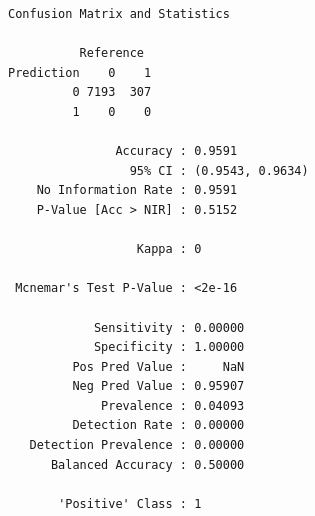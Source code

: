 \documentclass[
  letterpaper,
  DIV=11,
  numbers=noendperiod]{scrreprt}
\newenvironment{Shaded}{\begin{snugshade}}{\end{snugshade}}
\newcommand{\AttributeTok}[1]{\textcolor[rgb]{0.40,0.45,0.13}{#1}}
\newcommand{\FunctionTok}[1]{\textcolor[rgb]{0.28,0.35,0.67}{#1}}
\newcommand{\NormalTok}[1]{\textcolor[rgb]{0.00,0.23,0.31}{#1}}
\newcommand{\SpecialCharTok}[1]{\textcolor[rgb]{0.37,0.37,0.37}{#1}}
\newcommand{\StringTok}[1]{\textcolor[rgb]{0.13,0.47,0.30}{#1}}
\begin{document}
\begin{verbatim}
Confusion Matrix and Statistics

          Reference
Prediction    0    1
         0 7193  307
         1    0    0
                                          
               Accuracy : 0.9591          
                 95% CI : (0.9543, 0.9634)
    No Information Rate : 0.9591          
    P-Value [Acc > NIR] : 0.5152          
                                          
                  Kappa : 0               
                                          
 Mcnemar's Test P-Value : <2e-16          
                                          
            Sensitivity : 0.00000         
            Specificity : 1.00000         
         Pos Pred Value :     NaN         
         Neg Pred Value : 0.95907         
             Prevalence : 0.04093         
         Detection Rate : 0.00000         
   Detection Prevalence : 0.00000         
      Balanced Accuracy : 0.50000         
                                          
       'Positive' Class : 1               
                                          
\end{verbatim}

\begin{Shaded}
\end{Shaded}
\end{document}
